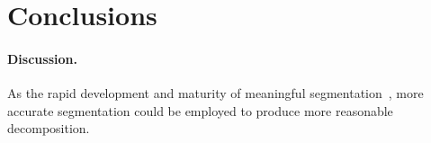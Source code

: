 \section{Conclusions}
\label{sec:con}

\paragraph{Discussion.} As the rapid development and maturity of meaningful segmentation~\cite{Shamir2008}, more accurate segmentation could be employed to produce more reasonable decomposition.